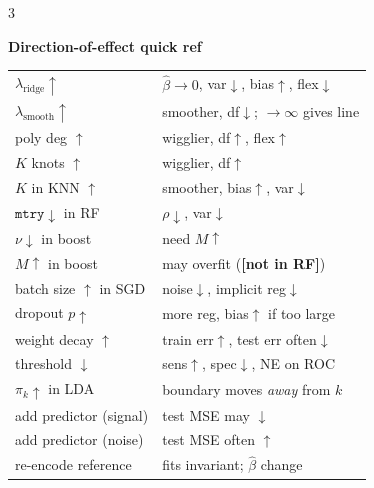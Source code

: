 \documentclass[a4paper,8pt]{extarticle}
\renewcommand{\section}[1]{\par\vspace{2pt}\noindent\colorbox{black!15}{\parbox{0.97\linewidth}{\strut\bfseries\small #1}}\par\vspace{1pt}}
\newcommand{\tr}[1]{\textcolor{red!70!black}{\textbf{[#1]}}} %
\begin{document}
\begin{multicols*}{3}
\section{Direction-of-effect quick ref}
{\setlength{\tabcolsep}{2pt}\renewcommand{\arraystretch}{0.95}
\begin{tabular}{ll}\hline
$\lambda_{\text{ridge}}\uparrow$ & $\hat\beta\to 0$, var$\downarrow$, bias$\uparrow$, flex$\downarrow$ \\
$\lambda_{\text{smooth}}\uparrow$ & smoother, df$\downarrow$; $\to\infty$ gives line\\
poly deg $\uparrow$ & wigglier, df$\uparrow$, flex$\uparrow$ \\
$K$ knots $\uparrow$ & wigglier, df$\uparrow$ \\
$K$ in KNN $\uparrow$ & smoother, bias$\uparrow$, var$\downarrow$\\
$\mathtt{mtry}\downarrow$ in RF & $\rho\downarrow$, var$\downarrow$\\
$\nu\downarrow$ in boost & need $M\uparrow$\\
$M\uparrow$ in boost & may overfit (\tr{not in RF})\\
batch size $\uparrow$ in SGD & noise$\downarrow$, implicit reg$\downarrow$\\
dropout $p\uparrow$ & more reg, bias$\uparrow$ if too large\\
weight decay $\uparrow$ & train err$\uparrow$, test err often$\downarrow$\\
threshold $\downarrow$ & sens$\uparrow$, spec$\downarrow$, NE on ROC\\
$\pi_k\uparrow$ in LDA & boundary moves \emph{away} from $k$\\
add predictor (signal) & test MSE may $\downarrow$ \\
add predictor (noise) & test MSE often $\uparrow$ \\
re-encode reference & fits invariant; $\hat\beta$ change \\\hline
\end{tabular}}


\end{multicols*}
\end{document}
